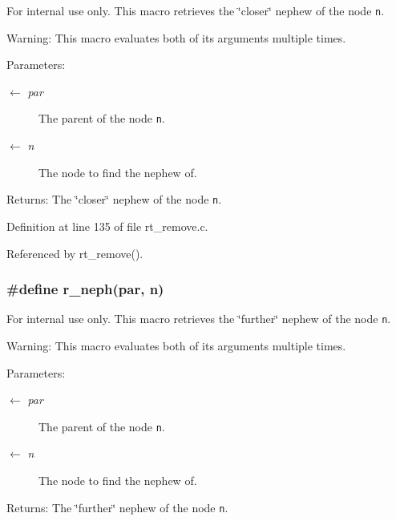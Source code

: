 \begin{Desc}
\item[For internal use only.]
This macro retrieves the \char`\"{}closer\char`\"{} nephew of the node {\tt n}.

\begin{Desc}
\item[Warning:]This macro evaluates both of its arguments multiple times.\end{Desc}
\begin{Desc}
\item[Parameters:]
\begin{description}
\item[\mbox{$\leftarrow$} {\em par}]The parent of the node {\tt n}. \item[\mbox{$\leftarrow$} {\em n}]The node to find the nephew of.\end{description}
\end{Desc}
\begin{Desc}
\item[Returns:]The \char`\"{}closer\char`\"{} nephew of the node {\tt n}.\end{Desc}
\end{Desc}


Definition at line 135 of file rt\_\-remove.c.

Referenced by rt\_\-remove().\hypertarget{group__dbprim__rbtree_ga52}{
\subsubsection[r\_\-neph]{\setlength{\rightskip}{0pt plus 5cm}\#define r\_\-neph(par, n)}}
\label{group__dbprim__rbtree_ga52}


\begin{Desc}
\item[For internal use only.]
This macro retrieves the \char`\"{}further\char`\"{} nephew of the node {\tt n}.

\begin{Desc}
\item[Warning:]This macro evaluates both of its arguments multiple times.\end{Desc}
\begin{Desc}
\item[Parameters:]
\begin{description}
\item[\mbox{$\leftarrow$} {\em par}]The parent of the node {\tt n}. \item[\mbox{$\leftarrow$} {\em n}]The node to find the nephew of.\end{description}
\end{Desc}
\begin{Desc}
\item[Returns:]The \char`\"{}further\char`\"{} nephew of the node {\tt n}.\end{Desc}
\end{Desc}


